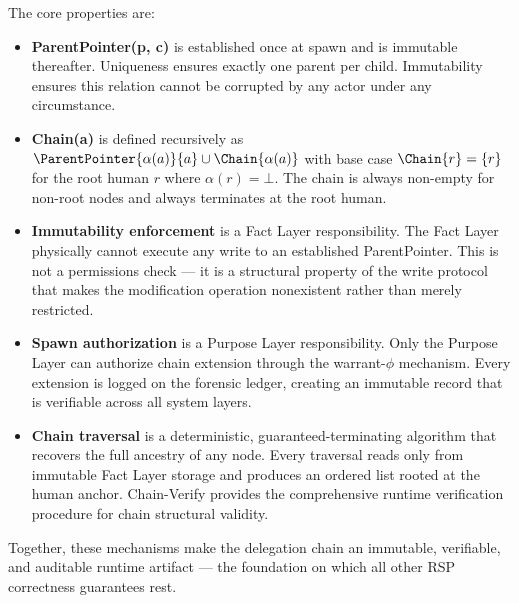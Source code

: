 The core properties are:

\begin{itemize}
    \item \textbf{ParentPointer(p, c)} is established once at spawn and is immutable thereafter. Uniqueness ensures exactly one parent per child. Immutability ensures this relation cannot be corrupted by any actor under any circumstance.
    \item \textbf{Chain(a)} is defined recursively as $\ParentPointer{\alpha(a)}{a} \cup \Chain{\alpha(a)}$ with base case $\Chain{r} = \{r\}$ for the root human $r$ where $\alpha(r) = \bot$. The chain is always non-empty for non-root nodes and always terminates at the root human.
    \item \textbf{Immutability enforcement} is a Fact Layer responsibility. The Fact Layer physically cannot execute any write to an established ParentPointer. This is not a permissions check — it is a structural property of the write protocol that makes the modification operation nonexistent rather than merely restricted.
    \item \textbf{Spawn authorization} is a Purpose Layer responsibility. Only the Purpose Layer can authorize chain extension through the warrant-$\phi$ mechanism. Every extension is logged on the forensic ledger, creating an immutable record that is verifiable across all system layers.
    \item \textbf{Chain traversal} is a deterministic, guaranteed-terminating algorithm that recovers the full ancestry of any node. Every traversal reads only from immutable Fact Layer storage and produces an ordered list rooted at the human anchor. Chain-Verify provides the comprehensive runtime verification procedure for chain structural validity.
\end{itemize}

Together, these mechanisms make the delegation chain an immutable, verifiable, and auditable runtime artifact — the foundation on which all other RSP correctness guarantees rest.
